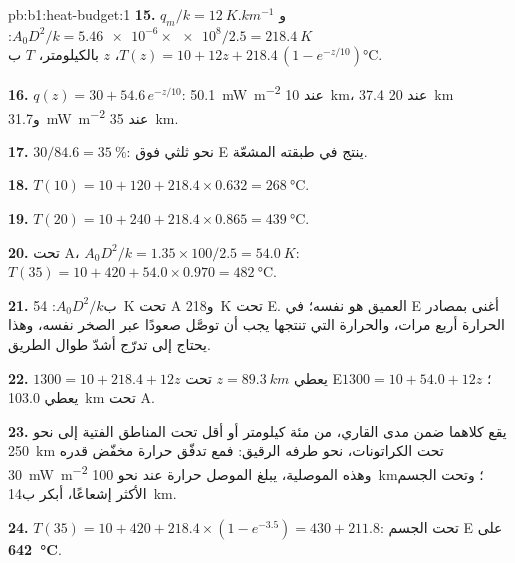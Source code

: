 \begin{solution}{pb:b1:heat-budget:1}
\textbf{15.} $q_m/k = \qty{12}{K.km^{-1}}$ و$A_0D^2/k = \num{5.46e-6}\times\num{e8}/2.5
= \qty{218.4}{K}$: $T(z) = 10 + 12z + 218.4\,(1 - e^{-z/10})$، $z$ بالكيلومتر، $T$ ب\unit{\degreeCelsius}.

\textbf{16.} $q(z) = 30 + 54.6\,e^{-z/10}$: \qty{50.1}{mW.m^{-2}} عند \qty{10}{km}،
\num{37.4} عند \qty{20}{km} و\qty{31.7}{mW.m^{-2}} عند \qty{35}{km}.

\textbf{17.} $30/84.6 = \qty{35}{\percent}$: نحو ثلثي  فوق E ينتج في طبقته المشعّة.

\textbf{18.} $T(10) = 10 + 120 + 218.4\times0.632 = \qty{268}{\degreeCelsius}$.

\textbf{19.} $T(20) = 10 + 240 + 218.4\times0.865 = \qty{439}{\degreeCelsius}$.

\textbf{20.} تحت A، $A_0D^2/k = 1.35\times100/2.5 = \qty{54.0}{K}$:
$T(35) = 10 + 420 + 54.0\times0.970 = \qty{482}{\degreeCelsius}$.

\textbf{21.} ب$A_0D^2/k$: \qty{54}{K} تحت A و\qty{218}{K} تحت E.  العميق هو نفسه؛  في E أغنى بمصادر الحرارة أربع مرات، والحرارة التي تنتجها يجب أن توصَّل صعودًا عبر الصخر نفسه، وهذا يحتاج إلى تدرّج أشدّ طوال الطريق.

\textbf{22.} $1300 = 10 + 218.4 + 12z$ يعطي $z = \qty{89.3}{km}$ تحت E؛
$1300 = 10 + 54.0 + 12z$ يعطي \qty{103.0}{km} تحت A.

\textbf{23.} يقع كلاهما ضمن مدى  القاري، من مئة كيلومتر أو أقل تحت المناطق الفتية إلى نحو \qty{250}{km} تحت الكراتونات، نحو طرفه الرقيق: فمع تدفّق حرارة مخفّض قدره \qty{30}{mW.m^{-2}} وهذه الموصلية، يبلغ  الموصل حرارة  عند نحو \qty{100}{km}؛ وتحت الجسم الأكثر إشعاعًا، أبكر ب\qty{14}{km}.

\textbf{24.} $T(35) = 10 + 420 + 218.4\times(1 - e^{-3.5}) = 430 + 211.8$:
 تحت الجسم E على \textbf{\qty[text-series-to-math=true]{642}{\degreeCelsius}}.
\end{solution}
